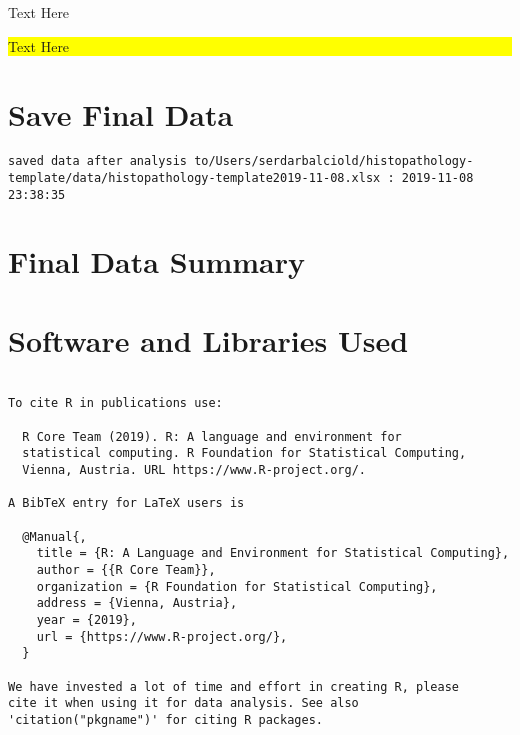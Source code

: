 \documentclass[]{article}
\begin{document}
\pagebreak

Text Here

\noindent

\colorbox{yellow}{
\parbox{\dimexpr\linewidth-2\fboxsep}{

Text Here

}
}

\pagebreak

\pagecolor{yellow}\afterpage{\nopagecolor}

\pagebreak

\pagebreak

\hypertarget{save-final-data}{%
\section{Save Final Data}\label{save-final-data}}

\begin{verbatim}
saved data after analysis to/Users/serdarbalciold/histopathology-template/data/histopathology-template2019-11-08.xlsx : 2019-11-08 23:38:35
\end{verbatim}

\pagebreak

\hypertarget{final-data-summary}{%
\section{Final Data Summary}\label{final-data-summary}}

\pagebreak

\hypertarget{software-and-libraries-used}{%
\section{Software and Libraries
Used}\label{software-and-libraries-used}}

\begin{verbatim}

To cite R in publications use:

  R Core Team (2019). R: A language and environment for
  statistical computing. R Foundation for Statistical Computing,
  Vienna, Austria. URL https://www.R-project.org/.

A BibTeX entry for LaTeX users is

  @Manual{,
    title = {R: A Language and Environment for Statistical Computing},
    author = {{R Core Team}},
    organization = {R Foundation for Statistical Computing},
    address = {Vienna, Austria},
    year = {2019},
    url = {https://www.R-project.org/},
  }

We have invested a lot of time and effort in creating R, please
cite it when using it for data analysis. See also
'citation("pkgname")' for citing R packages.
\end{verbatim}
\end{document}

